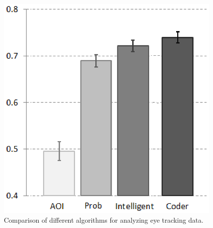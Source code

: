\begin{figure}[htb]
  \centering
  \includegraphics[width=0.6\linewidth]{images/algosComparison.eps}
  \caption{Comparison of different algorithms for analyzing eye tracking data.}
	\label{fig:quantitative}
\end{figure}


